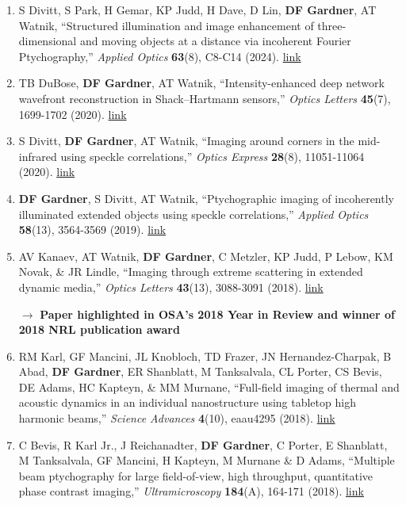 \documentclass[letterpaper,12pt]{article}
\begin{document}
\begin{enumerate}[leftmargin=*]
	
	\item S Divitt, S Park, H Gemar, KP Judd, H Dave, D Lin, \textbf{DF Gardner}, AT Watnik, ``Structured illumination and image enhancement of three-dimensional and moving objects at a distance via incoherent Fourier Ptychography,'' \emph{Applied Optics} \textbf{63}(8), C8-C14 (2024). \href{https://doi.org/10.1364/AO.505275}{link}
	
	\item TB DuBose, \textbf{DF Gardner}, AT Watnik, ``Intensity-enhanced deep network wavefront reconstruction in Shack–Hartmann sensors,'' \emph{Optics Letters} \textbf{45}(7), 1699-1702 (2020). \href{https://doi.org/10.1364/OL.389895}{link}

	\item S Divitt, \textbf{DF Gardner}, AT Watnik, ``Imaging around corners in the mid-infrared using speckle correlations,'' \emph{Optics Express} \textbf{28}(8), 11051-11064 (2020). \href{https://doi.org/10.1364/OE.388260}{link}

	\item \textbf{DF Gardner}, S Divitt, AT Watnik, ``Ptychographic imaging of incoherently illuminated extended objects using speckle correlations,'' \emph{Applied Optics} \textbf{58}(13), 3564-3569 (2019). \href{https://doi.org/10.1364/AO.58.003564}{link}
	
	\item AV Kanaev, AT Watnik, \textbf{DF Gardner}, C Metzler, KP Judd, P Lebow, KM Novak, \& JR Lindle, ``Imaging through extreme scattering in extended dynamic media,''  \emph{Optics Letters} \textbf{43}(13), 3088-3091 (2018). \href{https://doi.org/10.1364/OL.43.003088}{link}
	
	\quad $\rightarrow$ \textbf{Paper highlighted in OSA's 2018 Year in Review and winner of 2018 NRL publication award}
	
	\item RM Karl, GF Mancini, JL Knobloch, TD Frazer, JN Hernandez-Charpak, B Abad, \textbf{DF Gardner}, ER Shanblatt, M Tanksalvala, CL Porter, CS Bevis, DE Adams, HC Kapteyn, \& MM Murnane, ``Full-field imaging of thermal and acoustic dynamics in an individual nanostructure using tabletop high harmonic beams,'' \emph{Science Advances} \textbf{4}(10), eaau4295 (2018). \href{https://doi.org/10.1126/sciadv.aau4295}{link}
	
	\item  C Bevis, R Karl Jr., J Reichanadter, \textbf{DF Gardner}, C Porter, E Shanblatt, M Tanksalvala, GF Mancini, H Kapteyn, M Murnane \& D Adams, ``Multiple beam ptychography for large field-of-view, high throughput, quantitative phase contrast imaging,''  \emph{Ultramicroscopy} \textbf{184}(A), 164-171 (2018). \href{https://doi.org/10.1016/j.ultramic.2017.08.018}{link}
	

\end{enumerate}
\end{document}
